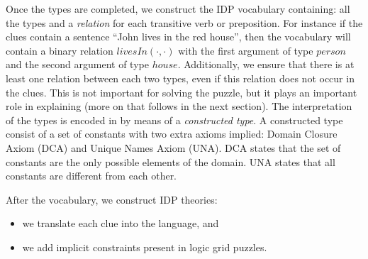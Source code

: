 Once the types are completed, we construct the IDP vocabulary containing: all the types and a \textit{relation} for each transitive verb or preposition. For instance if the clues contain a sentence ``John lives in the red house'', then the vocabulary will contain a binary relation $livesIn(\cdot,\cdot)$ with the first argument of type $person$ and the second argument of type $house$. %
Additionally, we ensure that there is at least one relation between each two types, even if this relation does not occur in the clues. This is not important for solving the puzzle, but it plays an important role in explaining (more on that follows in the next section). 
The interpretation of the types is encoded in \idp by means of a \emph{constructed type}.  A constructed type consist of a set of constants with two extra axioms implied: Domain Closure Axiom (DCA) and Unique Names Axiom (UNA). DCA states that the set of constants are the only possible elements of the domain. UNA states that all constants are different from each other.


After the vocabulary, we construct IDP theories: 
\begin{itemize}
 \item we translate each clue into the \idp language, and
 \item we add implicit constraints present in logic grid puzzles.
\end{itemize}

